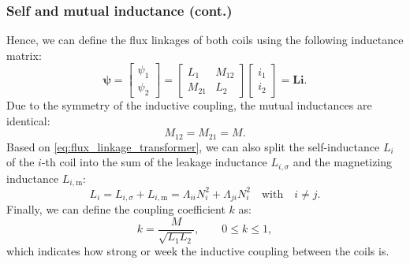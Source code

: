 \begin{frame}
	\frametitle{Self and mutual inductance (cont.)}
    Hence, we can define the flux linkages of both coils using the following inductance matrix:
    \begin{equation}
        \bm{\psi} = \begin{bmatrix} \psi_1 \\ \psi_2 \end{bmatrix} = \begin{bmatrix} L_1 & M_{12} \\ M_{21} & L_2 \end{bmatrix} \begin{bmatrix} i_1 \\ i_2 \end{bmatrix} = \bm{L}\bm{i}.
        \label{eq:flux_linkage_matrix_transformer}
    \end{equation}
    \pause
    Due to the symmetry of the inductive coupling, the mutual inductances are identical:
    \begin{equation}
        M_{12} = M_{21} = M.
    \end{equation}
    \pause
    Based on \eqref{eq:flux_linkage_transformer}, we can also split the self-inductance $L_i$ of the $i$-th coil into the sum of the leakage inductance $L_{i,\sigma}$ and the magnetizing inductance $L_{i,\mathrm{m}}$:
    \begin{equation}
        L_i = L_{i,\sigma} + L_{i,\mathrm{m}} = \Lambda_{ii}N_i^2 + \Lambda_{ji}N_i^2 \quad \mbox{with} \quad i \neq j. 
        \label{eq:inductance_split}
    \end{equation}
    \pause
    Finally, we can define the coupling coefficient $k$ as:
    \begin{equation}
        k = \frac{M}{\sqrt{L_1 L_2}}, \qquad 0 \leq k \leq 1,
        \label{eq:coupling_coefficient}
    \end{equation}
    which indicates how strong or week the inductive coupling between the coils is.
\end{frame}


